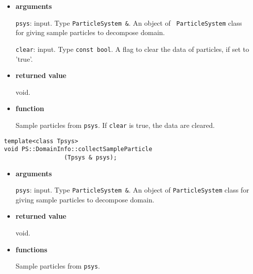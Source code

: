 \begin{itemize}

\item {\bf arguments}



\texttt{psys}: input. Type {\tt ParticleSystem \&}. An object of {\tt
ParticleSystem} class for giving sample particles to decompose domain.

\texttt{clear}: input. Type \texttt{const bool}. A flag to clear the data of particles,
if set to 'true'.

\item {\bf returned value}

void.

\item {\bf function}

Sample particles from {\tt psys}. If \texttt{clear} is true, the data
are cleared.


\end{itemize}

\begin{screen}
\begin{verbatim}
template<class Tpsys>
void PS::DomainInfo::collectSampleParticle
                 (Tpsys & psys);
\end{verbatim}
\end{screen}

\begin{itemize}

\item {\bf arguments}


\texttt{psys}: input. Type {\tt ParticleSystem \&}. An object of {\tt ParticleSystem} class
for giving sample particles to decompose domain.

\item {\bf returned value}

void.

\item {\bf functions}

Sample particles from {\tt psys}.

\end{itemize}

